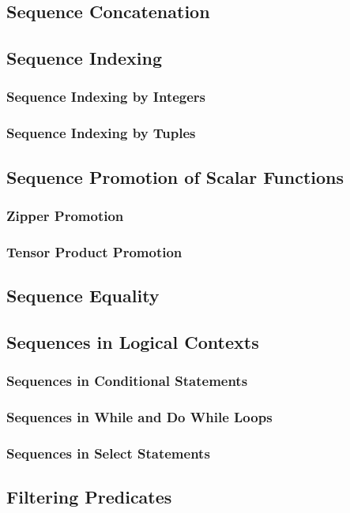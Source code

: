 \documentclass[10pt,twoside,titlepage]{article}
\begin{document}
\subsection{Sequence Concatenation}
\subsection{Sequence Indexing}
\subsubsection{Sequence Indexing by Integers}
\subsubsection{Sequence Indexing by Tuples}
\subsection{Sequence Promotion of Scalar Functions}
\subsubsection{Zipper Promotion}
\subsubsection{Tensor Product Promotion}
\subsection{Sequence Equality}
\subsection{Sequences in Logical Contexts}
\subsubsection{Sequences in Conditional Statements}
\subsubsection{Sequences in While and Do While Loops}
\subsubsection{Sequences in Select Statements}
\subsection{Filtering Predicates}
\end{document}
